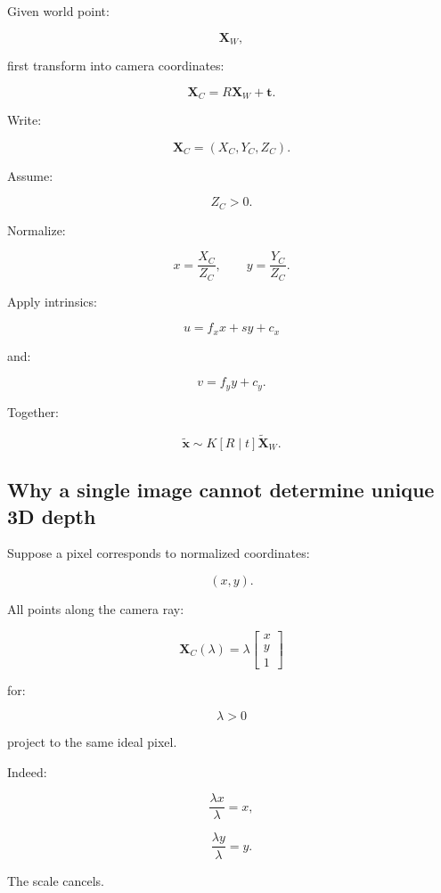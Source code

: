 \hypertarget{02-foundations-ii-ch035-complete-projection-equation}{}

Given world point:

\[
 \mathbf X_W,
\]

first transform into camera coordinates:

\[
 \boxed{ \mathbf X_C=R\mathbf X_W+\mathbf t }.
\]

Write:

\[
 \mathbf X_C=(X_C,Y_C,Z_C).
\]

Assume:

\[
 Z_C>0.
\]

Normalize:

\[
 \boxed{ x=\frac{X_C}{Z_C}, \qquad y=\frac{Y_C}{Z_C} }.
\]

Apply intrinsics:

\[
 \boxed{ u=f_xx+sy+c_x }
\]

and:

\[
 \boxed{ v=f_yy+c_y }.
\]

Together:

\[
 \boxed{ \tilde{\mathbf x} \sim K[R\mid t]\tilde{\mathbf X}_W }.
\]

\subsection{Why a single image cannot determine unique 3D depth}\label{02-foundations-ii-ch035-why-a-single-image-cannot-determine-unique-3d-depth}

\hypertarget{02-foundations-ii-ch035-why-a-single-image-cannot-determine-unique-3d-depth}{}

Suppose a pixel corresponds to normalized coordinates:

\[
 (x,y).
\]

All points along the camera ray:

\[
 \boxed{ \mathbf X_C(\lambda)= \lambda \begin{bmatrix} x\\y\\1 \end{bmatrix} }
\]

for:

\[
 \lambda>0
\]

project to the same ideal pixel.

Indeed:

\[
 \frac{\lambda x}{\lambda}=x,
\]

\[
 \frac{\lambda y}{\lambda}=y.
\]

The scale cancels.

